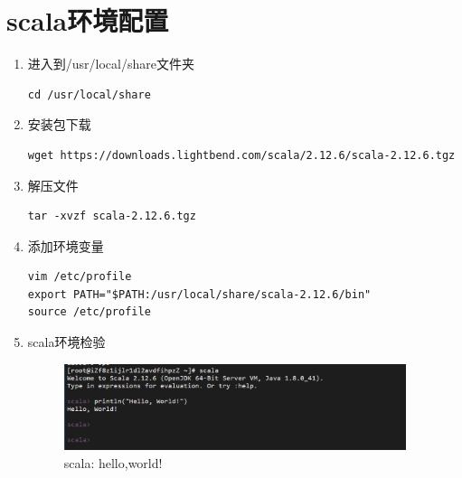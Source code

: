 \documentclass{article}
\begin{document}
\section{scala环境配置}
\begin{enumerate}
    \item 进入到/usr/local/share文件夹
    \begin{lstlisting}
cd /usr/local/share
    \end{lstlisting}

    \item 安装包下载
    \begin{lstlisting}
wget https://downloads.lightbend.com/scala/2.12.6/scala-2.12.6.tgz
    \end{lstlisting}

    \item 解压文件
    \begin{lstlisting}
tar -xvzf scala-2.12.6.tgz
    \end{lstlisting}

    \item 添加环境变量
    \begin{lstlisting}
vim /etc/profile
export PATH="$PATH:/usr/local/share/scala-2.12.6/bin"
source /etc/profile
    \end{lstlisting}

    \item scala环境检验
    \begin{figure}[htp]
        \centering
        \includegraphics[width=10cm]{scala环境检验}
        \caption{scala: hello,world!}
        \label{fig:aa}
    \end{figure}
    
    
    
\end{enumerate}
\end{document}
